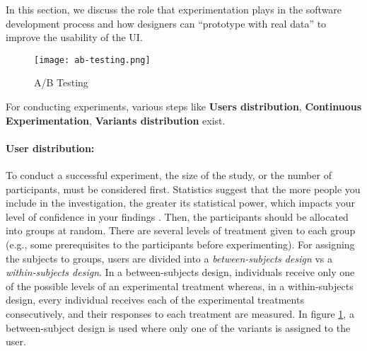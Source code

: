 In this section, we discuss the role that experimentation plays in the software development process and how designers can ``prototype with real data'' to improve the usability of the UI.
\begin{figure}[htbp!]
  \centering    
  \texttt{[image: ab-testing.png]}
  \caption[A/B Testing]{A/B Testing}
  \label{fig:background:abtesting}
\end{figure}
For conducting experiments, various steps like \textbf{Users distribution}, \textbf{Continuous Experimentation}, \textbf{Variants distribution} exist.  

\paragraph{User distribution:} To conduct a successful experiment, the size of the study, or the number of participants, must be considered first.
Statistics suggest that the more people you include in the investigation, the greater its statistical power, which impacts your level of confidence in your findings \cite{misc:experimentation:users}.
Then, the participants should be allocated into groups at random. 
There are several levels of treatment given to each group (e.g., some prerequisites to the participants before experimenting).
For assigning the subjects to groups, users are divided into a \textit{between-subjects design} vs a \textit{within-subjects design}.
In a between-subjects design, individuals receive only one of the possible levels of an experimental treatment whereas, in a within-subjects design, every individual receives each of the experimental treatments consecutively, and their responses to each treatment are measured.
In figure \ref{fig:background:abtesting}, a between-subject design is used where only one of the variants is assigned to the user.

